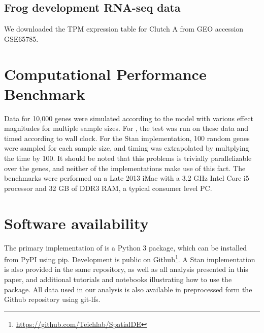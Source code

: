 \subsection{Frog development RNA-seq data}

We downloaded the TPM expression table for Clutch A from GEO accession GSE65785.

\section{Computational Performance Benchmark}
Data for 10,000 genes were simulated according to the  model with various effect magnitudes for multiple sample sizes. For , the test was run on these data and timed according to wall clock. For the Stan implementation, 100 random genes were sampled for each sample size, and timing was extrapolated by multplying the time by 100. It should be noted that this problems is trivially parallelizable over the genes, and neither of the implementations make use of this fact. The benchmarks were performed on a Late 2013 iMac with a 3.2 GHz Intel Core i5 processor and 32 GB of DDR3 RAM, a typical consumer level PC.

\section{Software availability}

The primary implementation of  is a Python 3 package, which can be installed from PyPI using pip. Development is public on Github\footnote{\url{https://github.com/Teichlab/SpatialDE}}. A Stan implementation is also provided in the same repository, as well as all analysis presented in this paper, and additional tutorials and notebooks illustrating how to use the package. All data used in our analysis is also available in preprocessed form the Github repository using git-lfs.


